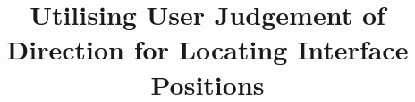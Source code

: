 \documentclass{bmcart}
\begin{document}
\begin{frontmatter}

\begin{fmbox}


\title{Utilising User Judgement of Direction for Locating Interface Positions}


\author[
   addressref={aff1},                   %
   corref={aff1},                       %
   email={j.a.mcnaughton@durham.ac.uk}   %
]{ }
\author[
   addressref={aff2},
   email={tcrick@cardiffmet.ac.uk}
]{ }



\address[id=aff1]{%
  , %
  ,                     %
  ,                              %
}
\address[id=aff2]{%
  ,
  ,
  ,
}


\end{fmbox}
\end{frontmatter}
\end{document}
